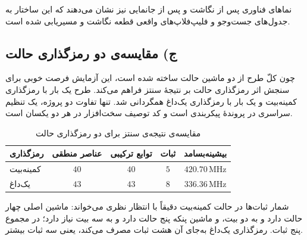 \documentclass[12pt,a4paper]{article}
\begin{document}

	نماهای فناوری پس از نگاشت و پس از جانمایی نیز نشان می‌دهند که این ساختار به جدول‌های جست‌وجو و فلیپ‌فلاپ‌های واقعی قطعه نگاشت و مسیریابی شده است.


	\subsection*{ج) مقایسه‌ی دو رمزگذاری حالت}
	چون کلّ طرح از دو ماشین حالت ساخته شده است، این آزمایش فرصت خوبی برای سنجش اثر رمزگذاری حالت بر نتیجهٔ سنتز فراهم می‌کند. طرح یک بار با رمزگذاری کمینه‌بیت و یک بار با رمزگذاری یک‌داغ همگردانی شد. تنها تفاوت دو پروژه، یک تنظیم سراسری در پروندهٔ پیکربندی است و کد توصیف سخت‌افزار در هر دو یکسان است.





	\begin{table}[H]
		\centering
		\small
		\begin{tabular}{|l|c|c|c|c|}
			\hline
			\textbf{رمزگذاری} & \textbf{عناصر منطقی} & \textbf{توابع ترکیبی} & \textbf{ثبات} & \textbf{بیشینه‌بسامد} \\ \hline
			کمینه‌بیت & \(40\) & \(40\) & \(5\)  & \(420.70\,\mathrm{MHz}\) \\ \hline
			یک‌داغ    & \(43\) & \(43\) & \(8\)  & \(336.36\,\mathrm{MHz}\) \\ \hline
		\end{tabular}
		\caption{مقایسه‌ی نتیجه‌ی سنتز برای دو رمزگذاری حالت}
	\end{table}

	شمار ثبات‌ها در حالت کمینه‌بیت دقیقاً با انتظار نظری می‌خواند: ماشین اصلی چهار حالت دارد و به دو بیت، و ماشین پنکه پنج حالت دارد و به سه بیت نیاز دارد؛ در مجموع پنج ثبات. رمزگذاری یک‌داغ به‌جای آن هشت ثبات مصرف می‌کند، یعنی سه ثبات بیشتر.
\end{document}
